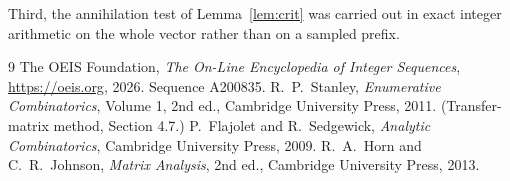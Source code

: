 \documentclass[11pt,a4paper]{article}
\theoremstyle{plain}
\theoremstyle{definition}
\begin{document}
Third, the annihilation test of Lemma~\ref{lem:crit} was carried out in exact integer
arithmetic on the whole vector rather than on a sampled prefix.

\begin{thebibliography}{9}
 The OEIS Foundation, \emph{The On-Line Encyclopedia of Integer
Sequences}, \url{https://oeis.org}, 2026. Sequence A200835.
 R.~P.~Stanley, \emph{Enumerative Combinatorics}, Volume 1, 2nd ed.,
Cambridge University Press, 2011. (Transfer-matrix method, Section 4.7.)
 P.~Flajolet and R.~Sedgewick, \emph{Analytic Combinatorics}, Cambridge
University Press, 2009.
 R.~A.~Horn and C.~R.~Johnson, \emph{Matrix Analysis}, 2nd ed., Cambridge
University Press, 2013.
\end{thebibliography}
\end{document}
